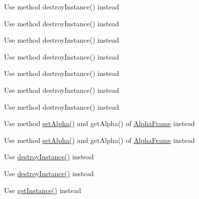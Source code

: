 \begin{DoxyRefList}
Use method destroy\+Instance() instead  
\item[\label{deprecated__deprecated000110}%
\Hypertarget{deprecated__deprecated000110}%
Member \hyperlink{classcocostudio_1_1TextReader_a684f3526eb1350859f153228bd8ede5e}{cocostudio\+:\+:Text\+Reader\+:\+:purge} ()]Use method destroy\+Instance() instead 

Use method destroy\+Instance() instead  
\item[\label{deprecated__deprecated000111}%
\Hypertarget{deprecated__deprecated000111}%
Member \hyperlink{classcocostudio_1_1UserCameraReader_a2af0072ffc30972ccb8172d9f9858fab}{cocostudio\+:\+:User\+Camera\+Reader\+:\+:purge} ()]Use method destroy\+Instance() instead 

Use method destroy\+Instance() instead  
\item[\label{deprecated__deprecated000112}%
\Hypertarget{deprecated__deprecated000112}%
Member \hyperlink{classcocostudio_1_1WidgetReader_af7aea963e2dc8f4d07adbd8db2f64e00}{cocostudio\+:\+:Widget\+Reader\+:\+:purge} ()]Use method destroy\+Instance() instead 

Use method destroy\+Instance() instead  
\item[\label{deprecated__deprecated000074}%
\Hypertarget{deprecated__deprecated000074}%
Member \hyperlink{classColorFrame_a9ff6186646bd482ba3d4fe0e242739d6}{Color\+Frame\+:\+:set\+Alpha} (G\+Lubyte alpha)]Use method \hyperlink{classColorFrame_a9ff6186646bd482ba3d4fe0e242739d6}{set\+Alpha()} and get\+Alpha() of \hyperlink{classAlphaFrame}{Alpha\+Frame} instead 

Use method \hyperlink{classColorFrame_a9ff6186646bd482ba3d4fe0e242739d6}{set\+Alpha()} and get\+Alpha() of \hyperlink{classAlphaFrame}{Alpha\+Frame} instead  
\item[\label{deprecated__deprecated000050}%
\Hypertarget{deprecated__deprecated000050}%
Member \hyperlink{classConfiguration_abf8266180bf01733dc5e4b5fb0006c78}{Configuration\+:\+:purge\+Configuration} ()]Use \hyperlink{classConfiguration_acbc9e73d16e5eb122e7daef71c955cf2}{destroy\+Instance()} instead 

Use \hyperlink{classConfiguration_acbc9e73d16e5eb122e7daef71c955cf2}{destroy\+Instance()} instead  
\item[\label{deprecated__deprecated000049}%
\Hypertarget{deprecated__deprecated000049}%
Member \hyperlink{classConfiguration_a298e51e4fadaa9157a9f8ba2688fb00e}{Configuration\+:\+:shared\+Configuration} ()]Use \hyperlink{classConfiguration_ae327d26e81014cf46b25802478fe9b8e}{get\+Instance()} instead 


\end{DoxyRefList}
